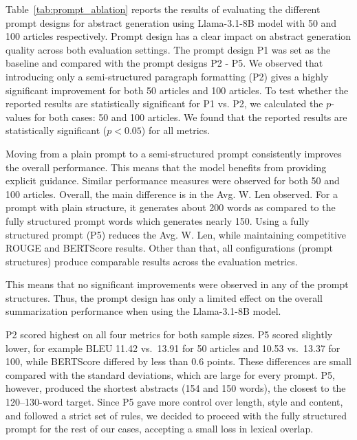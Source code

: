 \documentclass[bdcc,article,submit,pdftex,moreauthors]{Definitions/mdpi}
\newcommand{\commentVP}[1]{\textcolor{orange}{\textbf{VP:} #1}}
\begin{document}
Table~\ref{tab:prompt_ablation} reports the results of evaluating the different prompt designs for abstract generation using Llama-3.1-8B model with 50 and 100 articles respectively. Prompt design has a clear impact on abstract generation quality across both evaluation settings. 
The prompt design P1 was set as the baseline and compared with the prompt designs P2 - P5.
We observed that introducing only a semi-structured paragraph formatting (P2) gives a highly significant improvement for both 50 articles and 100 articles.
To test whether the reported results are statistically significant for P1 vs. P2, we calculated the $p$-values for both cases: 50 and 100 articles.
We found that the reported results are statistically significant ($p < 0.05$) for all metrics.

Moving from a plain prompt to a semi-structured prompt consistently improves the overall performance. This means that the model benefits from providing explicit guidance. Similar performance measures were observed for both 50 and 100 articles. Overall, the main difference is in the Avg. W. Len observed. For a prompt with plain structure, it generates about 200 words as compared to the fully structured prompt words which generates nearly 150.
Using a fully structured prompt (P5) reduces the Avg. W. Len, while maintaining competitive ROUGE and BERTScore results. 
Other than that, all configurations (prompt structures) produce comparable results across the evaluation metrics. 

This means that no significant improvements were observed in any of the prompt structures. Thus, the prompt design has only a limited effect on the overall summarization performance when using the Llama-3.1-8B model.

P2 scored highest on all four metrics for both sample sizes. P5 scored slightly lower, for example BLEU 11.42 vs.\ 13.91 for 50 articles and 10.53 vs.\ 13.37 for 100, while BERTScore differed by less than 0.6 points. These differences are small compared with the standard deviations, which are large for every prompt. P5, however, produced the shortest abstracts (154 and 150 words), the closest to the 120--130-word target. Since P5 gave more control over length, style and content, and followed a strict set of rules, we decided to proceed with the fully structured prompt for the rest of our cases, accepting a small loss in lexical overlap.
\end{document}
